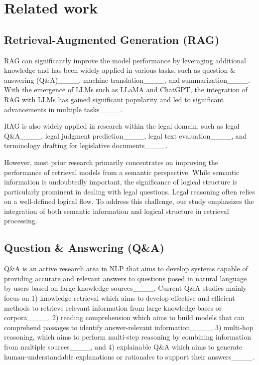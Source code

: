 \section{Related work}
\subsection{Retrieval-Augmented Generation (RAG)}

RAG can significantly improve the model performance by leveraging additional knowledge and has been widely applied in various tasks, such as question \& answering (Q\&A)____, machine
translation____, and summarization____. With the emergence of LLMs such as LLaMA and ChatGPT, the integration of RAG with LLMs has gained significant popularity and led to significant advancements in multiple tasks____.


RAG is also widely applied in research within the legal domain, such as legal Q\&A____, legal judgment prediction____, legal text evaluation____, and terminology drafting for legislative documents____. 

However, most prior research primarily concentrates on improving the performance of retrieval models from a semantic perspective. While semantic information is undoubtedly important, the significance of logical structure is particularly prominent in dealing with legal questions. Legal reasoning often relies on a well-defined logical flow. To address this challenge, our study emphasizes the integration of both semantic information and logical structure in retrieval processing.


\subsection{Question \& Answering (Q\&A)}
Q\&A is an active research area in NLP that aims to develop systems capable of providing accurate and relevant answers to questions posed in natural language by users based on large knowledge sources____. Current Q\&A studies mainly focus on 1) knowledge retrieval which aims to develop effective and efficient methods to retrieve relevant information from large knowledge bases or corpora____, 2) reading comprehension which aims to build models that can comprehend passages to identify answer-relevant information____, 3) multi-hop reasoning, which aims to perform multi-step reasoning by combining information from multiple sources____, and 4) explainable Q\&A which aims to generate human-understandable explanations or rationales to support their answers____.


